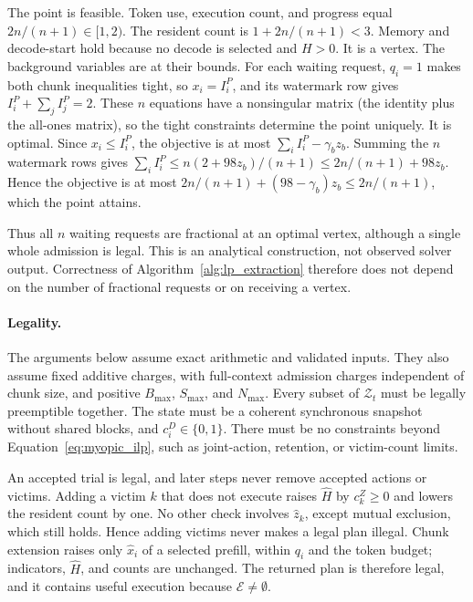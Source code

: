 \documentclass[11pt]{article}
\begin{document}
The point is feasible. Token use, execution count, and progress equal \(2n/(n+1)\in[1,2)\). The resident count is \(1+2n/(n+1)<3\). Memory and decode-start hold because no decode is selected and \(H>0\). It is a vertex. The background variables are at their bounds. For each waiting request, \(q_i=1\) makes both chunk inequalities tight, so \(x_i=I_i^P\), and its watermark row gives \(I_i^P+\sum_jI_j^P=2\). These \(n\) equations have a nonsingular matrix (the identity plus the all-ones matrix), so the tight constraints determine the point uniquely. It is optimal. Since \(x_i\le I_i^P\), the objective is at most \(\sum_iI_i^P-\gamma_bz_b\). Summing the \(n\) watermark rows gives \(\sum_iI_i^P\le n(2+98z_b)/(n+1)\le2n/(n+1)+98z_b\). Hence the objective is at most \(2n/(n+1)+(98-\gamma_b)z_b\le2n/(n+1)\), which the point attains.

Thus all \(n\) waiting requests are fractional at an optimal vertex, although a single whole admission is legal. This is an analytical construction, not observed solver output. Correctness of Algorithm~\ref{alg:lp_extraction} therefore does not depend on the number of fractional requests or on receiving a vertex.

\paragraph{Legality.}
The arguments below assume exact arithmetic and validated inputs. They also assume fixed additive charges, with full-context admission charges independent of chunk size, and positive \(B_{\max}\), \(S_{\max}\), and \(N_{\max}\). Every subset of \(\mathcal{Z}_t\) must be legally preemptible together. The state must be a coherent synchronous snapshot without shared blocks, and \(c_i^D\in\{0,1\}\). There must be no constraints beyond Equation~\ref{eq:myopic_ilp}, such as joint-action, retention, or victim-count limits.

An accepted trial is legal, and later steps never remove accepted actions or victims. Adding a victim \(k\) that does not execute raises \(\hat H\) by \(c_k^Z\ge0\) and lowers the resident count by one. No other check involves \(\hat z_k\), except mutual exclusion, which still holds. Hence adding victims never makes a legal plan illegal. Chunk extension raises only \(\hat x_i\) of a selected prefill, within \(q_i\) and the token budget; indicators, \(\hat H\), and counts are unchanged. The returned plan is therefore legal, and it contains useful execution because \(\mathcal{E}\ne\emptyset\).
\end{document}
